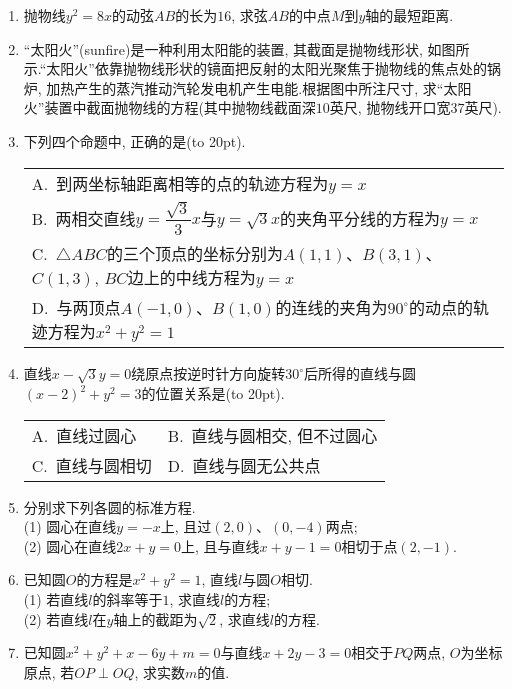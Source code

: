 \documentclass[10pt,a4paper]{article}
\newcommand{\bracket}[1]{(\hbox to #1pt{})}
\newcommand{\onech}[4]{\par\begin{tabular}{p{.9\textwidth}}
A.~#1\\
B.~#2\\
C.~#3\\
D.~#4
\end{tabular}}
\newcommand{\twoch}[4]{\par\begin{tabular}{p{.46\textwidth}p{.46\textwidth}}
A.~#1& B.~#2\\
C.~#3& D.~#4
\end{tabular}}
\begin{document}
\begin{enumerate}[1.]
\item 抛物线$y^2=8x$的动弦$AB$的长为$16$, 求弦$AB$的中点$M$到$y$轴的最短距离.
\item ``太阳火''(sunfire)是一种利用太阳能的装置, 其截面是抛物线形状, 如图所示.``太阳火''依靠抛物线形状的镜面把反射的太阳光聚焦于抛物线的焦点处的锅炉, 加热产生的蒸汽推动汽轮发电机产生电能.根据图中所注尺寸, 求``太阳火''装置中截面抛物线的方程(其中抛物线截面深$10$英尺, 抛物线开口宽$37$英尺).
\begin{center}
\end{center}
\item 下列四个命题中, 正确的是\bracket{20}.
\onech{到两坐标轴距离相等的点的轨迹方程为$y=x$}{两相交直线$y=\dfrac{\sqrt 3}3x$与$y=\sqrt 3x$的夹角平分线的方程为$y=x$}{$\triangle ABC$的三个顶点的坐标分别为$A(1,1)$、$B(3,1)$、$C(1,3)$, $BC$边上的中线方程为$y=x$}{与两顶点$A(-1,0)$、$B(1,0)$的连线的夹角为$90^{\circ }$的动点的轨迹方程为$x^2+y^2=1$}
\item 直线$x-\sqrt 3y=0$绕原点按逆时针方向旋转$30^{\circ }$后所得的直线与圆$(x-2)^2+y^2=3$的位置关系是\bracket{20}.
\twoch{直线过圆心}{直线与圆相交, 但不过圆心}{直线与圆相切}{直线与圆无公共点}
\item 分别求下列各圆的标准方程.\\
(1) 圆心在直线$y=-x$上, 且过$(2,0)$、$(0,-4)$两点;\\
(2) 圆心在直线$2x+y=0$上, 且与直线$x+y-1=0$相切于点$(2,-1)$.
\item 已知圆$O$的方程是$x^2+y^2=1$, 直线$l$与圆$O$相切.\\
(1) 若直线$l$的斜率等于$1$, 求直线$l$的方程;\\
(2) 若直线$l$在$y$轴上的截距为$\sqrt 2$, 求直线$l$的方程.
\item 已知圆$x^2+y^2+x-6y+m=0$与直线$x+2y-3=0$相交于$PQ$两点, $O$为坐标原点, 若$OP\perp OQ$, 求实数$m$的值.

\end{enumerate}
\end{document}
